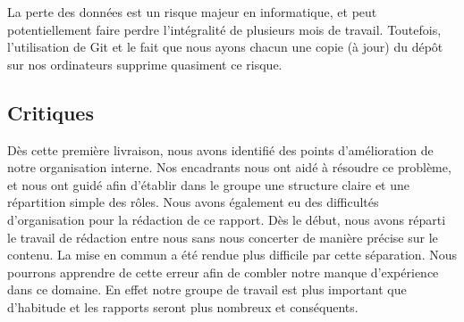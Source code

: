 	    La perte des données est un risque majeur en informatique, et peut potentiellement faire perdre l'intégralité de plusieurs mois de travail. Toutefois, l'utilisation de Git et le fait que nous ayons chacun une copie (à jour) du dépôt sur nos ordinateurs supprime quasiment ce risque.

	\subsection{Critiques}
		Dès cette première livraison, nous avons identifié des points d'amélioration de notre organisation interne. Nos encadrants nous ont aidé à résoudre ce problème, et nous ont guidé afin d'établir dans le groupe une structure claire et une répartition simple des rôles.
		Nous avons également eu des difficultés d'organisation pour la rédaction de ce rapport. Dès le début, nous avons réparti le travail de rédaction entre nous sans nous concerter de manière précise sur le contenu. La mise en commun a été rendue plus difficile par cette séparation. Nous pourrons apprendre de cette erreur afin de combler notre manque d'expérience dans ce domaine. En effet notre groupe de travail est plus important que d'habitude et les rapports seront plus nombreux et conséquents.